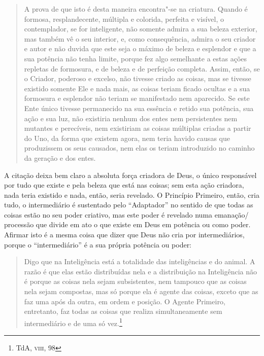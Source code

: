 \begin{quote}
A prova de que isto é desta maneira encontra"-se na
criatura. Quando é formosa, resplandecente, múltipla e colorida,
perfeita e visível, o contemplador, se for inteligente, não
somente admira a sua beleza exterior, mas também vê o seu
interior, e, como consequência, admira o seu criador e autor e
não duvida que este seja o máximo de beleza e esplendor e que a
sua potência não tenha limite, porque fez algo semelhante a
estas ações repletas de formosura, e de beleza e de perfeição
completa. Assim, então, se o Criador, poderoso e excelso, não
tivesse criado as coisas, mas se tivesse existido somente Ele e
nada mais, as coisas teriam ficado ocultas e a sua formosura e
esplendor não teriam se manifestado nem aparecido. Se este Ente
único tivesse permanecido na sua essência e retido sua potência,
sua ação e sua luz, não existiria nenhum dos entes nem
persistentes nem mutantes e perecíveis, nem existiriam as coisas
múltiplas criadas a partir do Uno, da forma que existem agora,
nem teria havido causas que produzissem os seus causados, nem
elas os teriam introduzido no caminho da geração e dos entes. 
\end{quote}

A citação deixa bem claro a absoluta força criadora de Deus, o
único responsável por tudo que existe e pela beleza que está nas
coisas; sem esta ação criadora, nada teria existido e nada,
então, seria revelado. O Princípio Primeiro, então, cria
tudo, o intermediário é sustentado pelo “Adaptador” no
sentido de que todas as coisas estão no seu poder criativo, mas
este poder é revelado numa emanação/\,processão que divide em ato
o que existe em Deus em potência ou como poder. Afirmar isto é a
mesma coisa que dizer que Deus não cria por intermediários,
porque o “intermediário” é a sua própria potência ou poder: 

\begin{quote}
Digo que na Inteligência está a totalidade das inteligências e do
animal. A razão é que elas estão distribuídas nela e a
distribuição na Inteligência não é porque as coisas nela sejam
subsistentes, nem tampouco que as coisas nela sejam compostas,
mas só porque ela é agente das coisas, exceto que as faz uma após
da outra, em ordem e posição. O Agente Primeiro, entretanto, faz
todas as coisas que realiza simultaneamente sem intermediário e
de uma só vez.\footnote{ TdA, \textsc{viii}, 98}
\end{quote}

